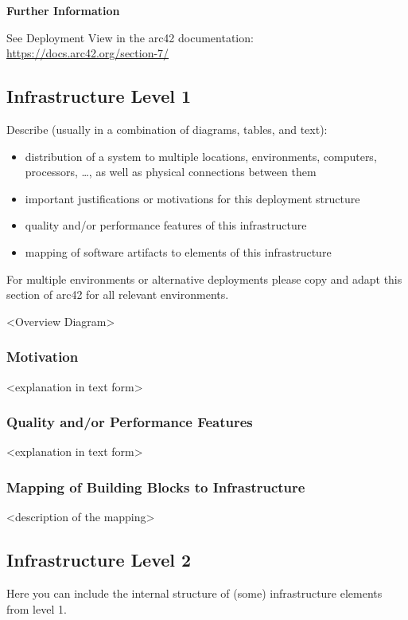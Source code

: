 \documentclass[12pt,a4paper]{article}
\newcommand{\minititle}[1]{%
  \par\addvspace{0.6\baselineskip}%
  \noindent\textbf{#1}\par\nobreak%
  \noindent\ignorespaces%
}
\begin{document}
\minititle{Further Information}
See Deployment View in the arc42 documentation:
\href{https://docs.arc42.org/section-7/}{https://docs.arc42.org/section-7/}

\subsection{Infrastructure Level 1}

Describe (usually in a combination of diagrams, tables, and text):
\begin{itemize}
  \item distribution of a system to multiple locations, environments, computers, processors, \dots, as well as physical connections between them
  \item important justifications or motivations for this deployment structure
  \item quality and/or performance features of this infrastructure
  \item mapping of software artifacts to elements of this infrastructure
\end{itemize}

For multiple environments or alternative deployments please copy and adapt this section of arc42 for all relevant environments.

\textless Overview Diagram\textgreater

\subsubsection*{Motivation}
\textless explanation in text form\textgreater

\subsubsection*{Quality and/or Performance Features}
\textless explanation in text form\textgreater

\subsubsection*{Mapping of Building Blocks to Infrastructure}
\textless description of the mapping\textgreater

\subsection{Infrastructure Level 2}

Here you can include the internal structure of (some) infrastructure elements from level 1.
\end{document}
